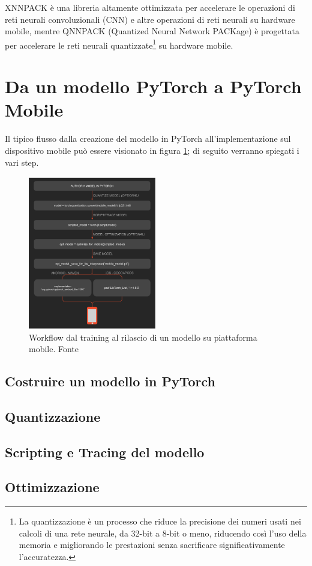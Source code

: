XNNPACK\cite{XNNPACK} è una libreria altamente ottimizzata per accelerare le operazioni di reti neurali convoluzionali (CNN) e altre operazioni di reti neurali su hardware mobile,
mentre QNNPACK\cite{QNNPACK} (Quantized Neural Network PACKage) è progettata per accelerare le reti neurali quantizzate\footnote{La quantizzazione è un processo che riduce la precisione dei numeri usati nei calcoli di una rete neurale, da 32-bit a 8-bit o meno, riducendo così l'uso della memoria e migliorando le prestazioni senza sacrificare significativamente l'accuratezza.}
su hardware mobile.


\section{Da un modello PyTorch a PyTorch Mobile}
Il tipico flusso dalla creazione del modello in PyTorch all'implementazione sul dispositivo mobile può essere visionato in figura \ref{fig:pyworkflow}; di seguito
verranno spiegati i vari step.

\begin{figure}[ht]
    \centering
    \includegraphics[width=0.5\textwidth]{Immagini/workflow_pytorch.png}
    \caption{Workflow dal training al rilascio di un modello su piattaforma mobile. Fonte \cite{PyTorchOfficial}}
    \label{fig:pyworkflow}
\end{figure}

\subsection{Costruire un modello in PyTorch}
\subsection{Quantizzazione}
\subsection{Scripting e Tracing del modello}
\subsection{Ottimizzazione}
